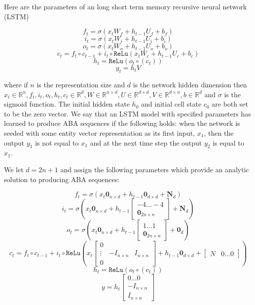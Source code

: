 \documentclass[12pt]{article}
\begin{document}
Here are the parameters of an long short term memory recursive neural network (LSTM)

\[f_t = \sigma(x_t W_f  + h_{t-1} U_f  + b_f) \]
\[i_t = \sigma(x_t W_i  + h_{t-1} U_i + b_i) \]
\[o_t = \sigma(x_t W_o +  h_{t-1} U_o + b_o)\]
\[c_t = f_t \circ c_{t-1} + i_t \circ \texttt{ReLu}(x_tW_c + h_{t-1}U_c + b_c) \]
\[h_t = \texttt{ReLu}(o_t \circ (c_t))\]
\[y_t = h_tV\]

where if $n$ is the representation size and $d$ is the network hidden dimension then $x_t \in \mathbb{R}^n, f_t, i_t, o_t,  h_t, c_t \in \mathbb{R}^d, W \in \mathbb{R}^{n \times d}, U \in \mathbb{R}^{d \times d}, V \in \mathbb{R}^{d \times n}, b \in \mathbb{R}^d$ and $\sigma$ is the sigmoid function. The initial hidden state $h_0$ and initial cell state $c_0$ are both set to be the zero vector. We say that an LSTM model with specified parameters has learned to produce ABA sequences if the following holds: when the network is seeded with some entity vector representation as its first input, $x_1$, then the output $y_1$ is not equal to $x_1$ and at the next time step the output $y_2$ is equal to $x_1$.

We let $d = 2n + 1$ and assign the following parameters which provide an analytic solution to producing ABA sequences:

\[f_t = \sigma(x_t \textbf{0}_{n\times d} + h_{t-1}\textbf{0}_{d \times d} + \textbf{N}_{d}) \]
\[i_t = \sigma(x_t\textbf{0}_{n\times d} + h_{t-1}\begin{bmatrix} -4 \dots -4 \\ \textbf{0}_{2n\times n} \end{bmatrix}  + \textbf{N}_d)   \]
\[o_t = \sigma(x_t\textbf{0}_{n\times d} +  h_{t-1} \begin{bmatrix} 1 \dots 1 \\ \textbf{0}_{2n\times n} \end{bmatrix} + \textbf{0}_{d})\]
\[c_t = f_t \circ c_{t-1} + i_t \circ \texttt{ReLu}(x_t \begin{bmatrix} 0 &  & \\ \vdots & -I_{n \times n} & I_{n \times n}\\ 0 & &  \end{bmatrix} + h_{t-1}\textbf{0}_{d \times d} + \begin{bmatrix} N & 0 \dots 0\end{bmatrix}) \]
\[h_t = \texttt{ReLu}(o_t \circ (c_t))\]
\[y = h_t \begin{bmatrix} 0 \dots 0 \\ -I_{n \times n} \\ I_{n \times n}  \end{bmatrix}\]
\end{document}
